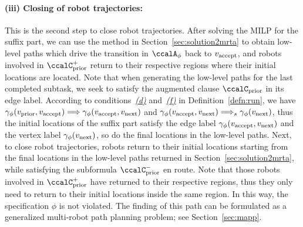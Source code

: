 \documentclass[Afour,sageh,times]{sagej}
\newcommand{\ltl}{ {\it LTL}$_{-\bigcirc}$ }
\newcommand{\autop}{\ccalA_{\phi}}
\newcommand{\vertex}[1]{v_{\textup{#1}}}
\newcommand{\simplies}{\DOTSB\Longrightarrow}
\begin{document}
{{\paragraph{(iii) Closing of robot trajectories:}\label{sec:closing}
This is the second step to close robot trajectories. After solving the MILP for the suffix part, we can use the method in Section~\ref{sec:solution2mrta} to obtain low-level paths which drive the transition in $\autop$ back to $\vertex{accept}$, and robots involved in $\ccalC_{\text{prior}}^+$ return to their respective regions where their initial locations are located. Note that when generating the low-level paths for the last completed subtask, we seek to satisfy  the augmented  clause $\ccalC_{\text{prior}}$  in its edge label. According to conditions~\hyperref[cond:d]{\it (d)} and~\hyperref[cond:f]{\it (f)} in Definition~\ref{defn:run}, we have $\gamma_\phi(\vertex{prior}, \vertex{accept}) \simplies \gamma_\phi(\vertex{accept}, \vertex{next})$ and $\gamma_\phi(\vertex{accept}, \vertex{next}) \simplies_s \gamma_\phi(\vertex{next})$, thus the initial locations of the suffix part satisfy the edge label $\gamma_\phi(\vertex{accept}, \vertex{next})$ and the  vertex label $\gamma_\phi(\vertex{next})$, so do the final locations in the low-level paths. Next, to close robot trajectories, robots return to their initial locations starting from the final locations in the low-level paths returned in Section~\ref{sec:solution2mrta}, while satisfying the subformula $\ccalC_{\text{prior}}^-$ en route. Note that those robots involved in $\ccalC_{\text{prior}}^+$ have returned to their respective regions, thus they only need to return to their initial locations inside the same region. In this way, the specification $\phi$ is not violated. The finding of this path can be formulated as a generalized multi-robot path planning problem; see Section~\ref{sec:mapp}.



}}
\end{document}
